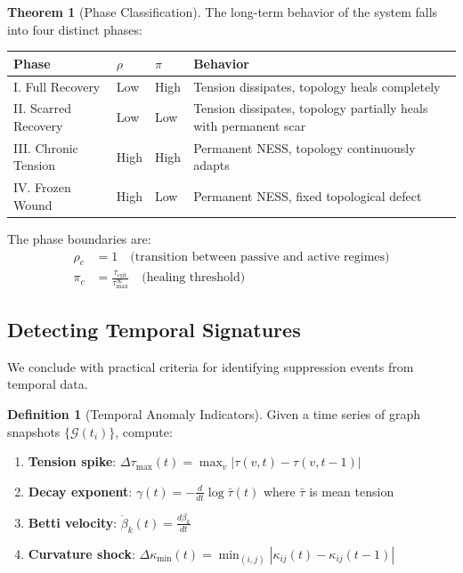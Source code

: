 \documentclass[12pt,a4paper]{article}
\theoremstyle{definition}
\newtheorem{definition}{Definition}[section]
\newtheorem{theorem}{Theorem}[section]
\theoremstyle{remark}
\newcommand{\Graph}{\mathcal{G}}         %
\begin{document}
\begin{theorem}[Phase Classification]
\label{thm:phases}
The long-term behavior of the system falls into four distinct phases:

\begin{center}
\renewcommand{\arraystretch}{1.4}
\begin{tabular}{p{2.5cm}p{2cm}p{2cm}p{5cm}}
\toprule
\textbf{Phase} & \textbf{$\rho$} & \textbf{$\pi$} & \textbf{Behavior} \\
\midrule
I. Full Recovery & Low & High & Tension dissipates, topology heals completely \\
\addlinespace
II. Scarred Recovery & Low & Low & Tension dissipates, topology partially heals with permanent scar \\
\addlinespace
III. Chronic Tension & High & High & Permanent NESS, topology continuously adapts \\
\addlinespace
IV. Frozen Wound & High & Low & Permanent NESS, fixed topological defect \\
\bottomrule
\end{tabular}
\end{center}
\end{theorem}

The phase boundaries are:
\begin{align}
    \rho_c &= 1 \quad \text{(transition between passive and active regimes)} \\
    \pi_c &= \frac{\tau_{\text{crit}}}{\tau^{\infty}_{\max}} \quad \text{(healing threshold)}
\end{align}

\subsection{Detecting Temporal Signatures}

We conclude with practical criteria for identifying suppression events from temporal data.

\begin{definition}[Temporal Anomaly Indicators]
Given a time series of graph snapshots $\{\Graph(t_i)\}$, compute:
\begin{enumerate}
    \item \textbf{Tension spike}: $\Delta\tau_{\max}(t) = \max_v |\tau(v, t) - \tau(v, t-1)|$
    \item \textbf{Decay exponent}: $\gamma(t) = -\frac{d}{dt} \log \bar{\tau}(t)$ where $\bar{\tau}$ is mean tension
    \item \textbf{Betti velocity}: $\dot{\beta}_k(t) = \frac{d\beta_k}{dt}$
    \item \textbf{Curvature shock}: $\Delta\kappa_{\min}(t) = \min_{(i,j)} |\kappa_{ij}(t) - \kappa_{ij}(t-1)|$
\end{enumerate}
\end{definition}
\end{document}
